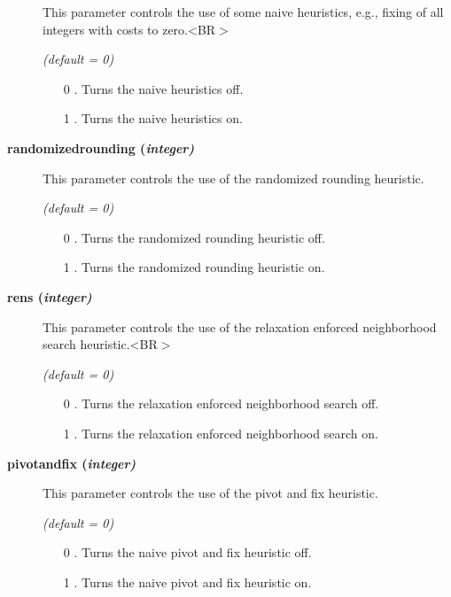 \begin{description}
This parameter controls the use of some naive heuristics, e.g., fixing of all integers with costs to zero.<BR$>$

\textsl{(default = 0)}
\begin{itemize}
\item[0] .
Turns the naive heuristics off.
\item[1] .
Turns the naive heuristics on.
\end{itemize}

\item[\label{randomizedrounding}\hypertarget{randomizedrounding}
{\textbf{randomizedrounding (\slshape{integer})}}]\hspace{1.0in}

This parameter controls the use of the randomized rounding heuristic.

\textsl{(default = 0)}
\begin{itemize}
\item[0] .
Turns the randomized rounding heuristic off.
\item[1] .
Turns the randomized rounding heuristic on.
\end{itemize}

\item[\label{rens}\hypertarget{rens}
{\textbf{rens (\slshape{integer})}}]\hspace{1.0in}

This parameter controls the use of the relaxation enforced neighborhood search heuristic.<BR$>$

\textsl{(default = 0)}
\begin{itemize}
\item[0] .
Turns the relaxation enforced neighborhood search off.
\item[1] .
Turns the relaxation enforced neighborhood search on.
\end{itemize}

\item[\label{pivotandfix}\hypertarget{pivotandfix}
{\textbf{pivotandfix (\slshape{integer})}}]\hspace{1.0in}

This parameter controls the use of the pivot and fix heuristic.

\textsl{(default = 0)}
\begin{itemize}
\item[0] .
Turns the naive pivot and fix heuristic off.
\item[1] .
Turns the naive pivot and fix heuristic on.
\end{itemize}


\end{description}
